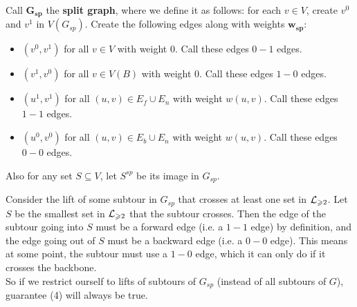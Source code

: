 \documentclass[./main.tex]{subfiles}
\begin{document}
			\vspace{2mm}\pagebreak[2]
			\begin{definition}
				Call $\bm{G_{sp}}$ the \textbf{split graph}, where we define it as follows: for each $v\in V$, create $v^0$ and $v^1$ in $V(G_{sp})$. Create the following edges along with weights $\bm{w_{sp}}$:
				\begin{itemize}[$-$]
					\item $(v^0, v^1)$ for all $v\in V$ with weight $0$. Call these edges $0-1$ edges.
					\item $(v^1, v^0)$ for all $v\in V(B)$ with weight $0$. Call these edges $1-0$ edges.
					\item $(u^1, v^1)$ for all $(u,v)\in E_f\cup E_n$ with weight $w(u,v)$. Call these edges $1-1$ edges.
					\item $(u^0, v^0)$ for all $(u,v)\in E_b\cup E_n$ with weight $w(u,v)$. Call these edges $0-0$ edges.
				\end{itemize}
				Also for any set $S\subseteq V$, let $S^{sp}$ be its image in $G_{sp}$.\\
			\end{definition}
			
			Consider the lift of some subtour in $G_{sp}$ that crosses at least one set in $\mathcal{L}_{\geqslant 2}$. Let $S$ be the smallest set in $\mathcal{L}_{\geqslant 2}$ that the subtour crosses. 
			Then the edge of the subtour going into $S$ must be a forward edge (i.e. a $1-1$ edge) by definition, and the edge going out of $S$ must be a backward edge (i.e. a $0-0$ edge). This means at some point, the subtour must use a $1-0$ edge, which it can only do if it crosses the backbone.\\
			\vspace{1mm}
			So if we restrict ourself to lifts of subtours of $G_{sp}$ (instead of all subtours of $G$), guarantee (4) will always be true.\vspace{2mm}
			
\end{document}
